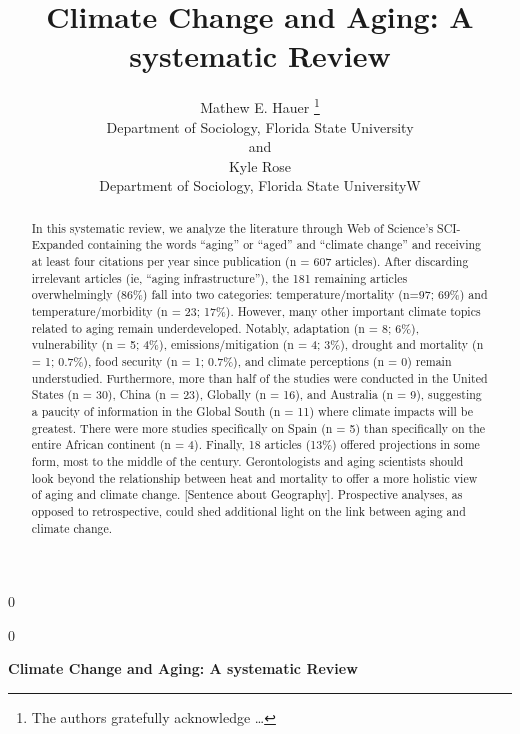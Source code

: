 \documentclass[12pt]{article}
\newcommand{\blind}{0}
\begin{document}
\def\spacingset#1{\renewcommand{\baselinestretch}%
{#1}\small\normalsize} \spacingset{1}



\blind
{
  \title{\bf Climate Change and Aging: A systematic Review}

  \author{
        Mathew E. Hauer \thanks{The authors gratefully acknowledge
\ldots{}} \\
    Department of Sociology, Florida State University\\
     and \\     Kyle Rose \\
    Department of Sociology, Florida State UniversityW\\
      }
  \maketitle
} \fi

\blind
{
  \bigskip
  \bigskip
  \bigskip
  \begin{center}
    {\LARGE\bf Climate Change and Aging: A systematic Review}
  \end{center}
  \medskip
} \fi

\bigskip
\begin{abstract}
In this systematic review, we analyze the literature through Web of
Science's SCI-Expanded containing the words ``aging'' or ``aged'' and
``climate change'' and receiving at least four citations per year since
publication (n = 607 articles). After discarding irrelevant articles
(ie, ``aging infrastructure''), the 181 remaining articles
overwhelmingly (86\%) fall into two categories: temperature/mortality
(n=97; 69\%) and temperature/morbidity (n = 23; 17\%). However, many
other important climate topics related to aging remain underdeveloped.
Notably, adaptation (n = 8; 6\%), vulnerability (n = 5; 4\%),
emissions/mitigation (n = 4; 3\%), drought and mortality (n = 1; 0.7\%),
food security (n = 1; 0.7\%), and climate perceptions (n = 0) remain
understudied. Furthermore, more than half of the studies were conducted
in the United States (n = 30), China (n = 23), Globally (n = 16), and
Australia (n = 9), suggesting a paucity of information in the Global
South (n = 11) where climate impacts will be greatest. There were more
studies specifically on Spain (n = 5) than specifically on the entire
African continent (n = 4). Finally, 18 articles (13\%) offered
projections in some form, most to the middle of the century.
Gerontologists and aging scientists should look beyond the relationship
between heat and mortality to offer a more holistic view of aging and
climate change. {[}Sentence about Geography{]}. Prospective analyses, as
opposed to retrospective, could shed additional light on the link
between aging and climate change.
\end{abstract}
\end{document}
